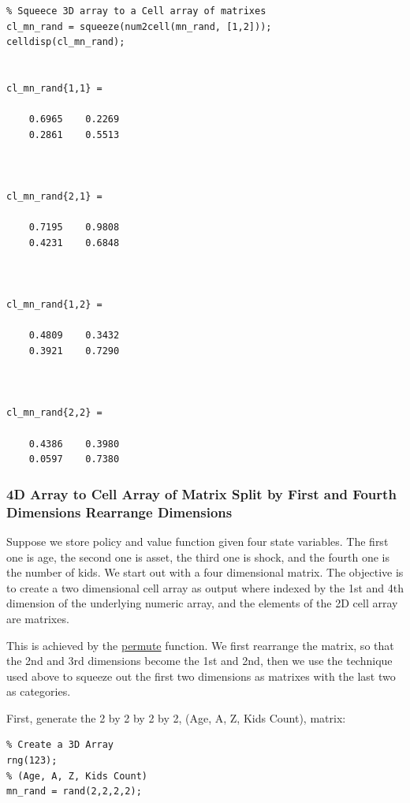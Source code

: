 \documentclass[
]{book}
\begin{document}
\begin{verbatim}
% Squeece 3D array to a Cell array of matrixes
cl_mn_rand = squeeze(num2cell(mn_rand, [1,2]));
celldisp(cl_mn_rand);


cl_mn_rand{1,1} =
 
    0.6965    0.2269
    0.2861    0.5513



cl_mn_rand{2,1} =
 
    0.7195    0.9808
    0.4231    0.6848



cl_mn_rand{1,2} =
 
    0.4809    0.3432
    0.3921    0.7290



cl_mn_rand{2,2} =
 
    0.4386    0.3980
    0.0597    0.7380
\end{verbatim}

\hypertarget{d-array-to-cell-array-of-matrix-split-by-first-and-fourth-dimensions-rearrange-dimensions}{%
\subsubsection{4D Array to Cell Array of Matrix Split by First and Fourth Dimensions Rearrange Dimensions}\label{d-array-to-cell-array-of-matrix-split-by-first-and-fourth-dimensions-rearrange-dimensions}}

Suppose we store policy and value function given four state variables.
The first one is age, the second one is asset, the third one is shock,
and the fourth one is the number of kids. We start out with a four
dimensional matrix. The objective is to create a two dimensional cell
array as output where indexed by the 1st and 4th dimension of the
underlying numeric array, and the elements of the 2D cell array are
matrixes.

This is achieved by the
\href{https://www.mathworks.com/help/matlab/ref/permute.html}{permute}
function. We first rearrange the matrix, so that the 2nd and 3rd
dimensions become the 1st and 2nd, then we use the technique used above
to squeeze out the first two dimensions as matrixes with the last two as
categories.

First, generate the 2 by 2 by 2 by 2, (Age, A, Z, Kids Count), matrix:

\begin{verbatim}
% Create a 3D Array
rng(123);
% (Age, A, Z, Kids Count)
mn_rand = rand(2,2,2,2);
\end{verbatim}
\end{document}
